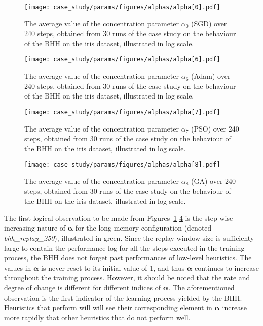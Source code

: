 \begin{figure}[htpb]
	\centering
	\texttt{[image: case\_study/params/figures/alphas/alpha[0].pdf]}
	\caption{The average value of the concentration parameter $\alpha_{0}$ (\acs{SGD}) over 240 steps, obtained from 30 runs of the case study on the behaviour of the \acs{BHH} on the iris dataset, illustrated in log scale.}
	\label{fig:results:case_study:alpha:0}
\end{figure}

\begin{figure}[htpb]
	\centering
	\texttt{[image: case\_study/params/figures/alphas/alpha[6].pdf]}
	\caption{The average value of the concentration parameter $\alpha_{6}$ (\acs{Adam}) over 240 steps, obtained from 30 runs of the case study on the behaviour of the \acs{BHH} on the iris dataset, illustrated in log scale.}
	\label{fig:results:case_study:alpha:6}
\end{figure}

\begin{figure}[htpb]
	\centering
	\texttt{[image: case\_study/params/figures/alphas/alpha[7].pdf]}
	\caption{The average value of the concentration parameter $\alpha_{7}$ (\acs{PSO}) over 240 steps, obtained from 30 runs of the case study on the behaviour of the \acs{BHH} on the iris dataset, illustrated in log scale.}
	\label{fig:results:case_study:alpha:7}
\end{figure}

\begin{figure}[htpb]
	\centering
	\texttt{[image: case\_study/params/figures/alphas/alpha[8].pdf]}
	\caption{The average value of the concentration parameter $\alpha_{8}$ (\acs{GA}) over 240 steps, obtained from 30 runs of the case study on the behaviour of the \acs{BHH} on the iris dataset, illustrated in log scale.}
	\label{fig:results:case_study:alpha:8}
\end{figure}

The first logical observation to be made from Figures~\ref{fig:results:case_study:alpha:0}-\ref{fig:results:case_study:alpha:8} is the step-wise increasing nature of $\boldsymbol{\alpha}$ for the long memory configuration (denoted \textit{bhh\_replay\_250}), illustrated in green. Since the replay window size is sufficienty large to contain the performance log for all the steps executed in the training process, the \acs{BHH} does not forget past performances of low-level heuristics. The values in $\boldsymbol{\alpha}$ is never reset to its initial value of 1, and thus $\boldsymbol{\alpha}$ continues to increase throughout the training process. However, it should be noted that the rate and degree of change is different for different indices of $\boldsymbol{\alpha}$. The aforementioned observation is the first indicator of the learning process yielded by the \acs{BHH}. Heuristics that perform will will see their corresponding element in $\boldsymbol{\alpha}$ increase more rapidly that other heuristics that do not perform well.

